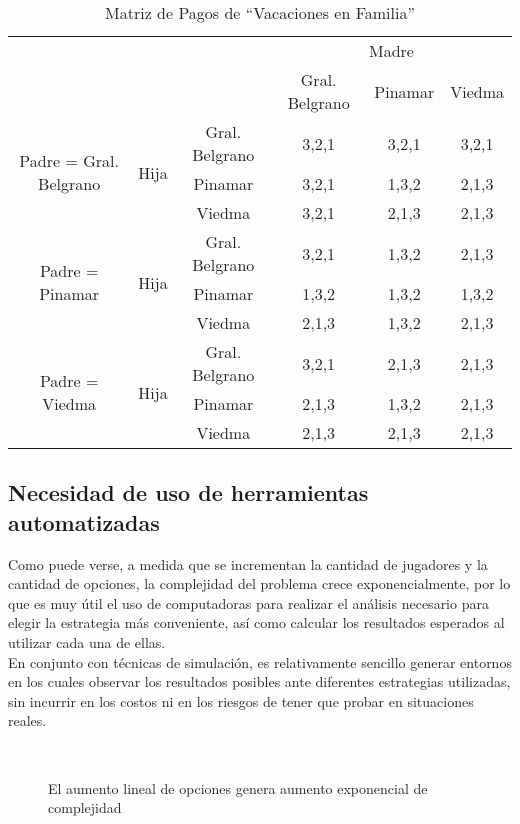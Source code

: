 \documentclass[10pt]{article}
\numberwithin{equation}{section}
\numberwithin{figure}{section}
\numberwithin{table}{section}
\begin{document}
\begin{table}[!ht]
\begin{center}
  \begin{tabular}{|c|c|c|c|c|c|}
  \hline
  
 \multicolumn{3}{|c|}{\multirow{2}{*}{}} & \multicolumn{3}{|c|}{Madre} \\ \cline{4-6}
 \multicolumn{3}{|c|}{} & Gral. Belgrano & Pinamar & Viedma \\ \hline
 \multirow{3}{*}{Padre = Gral. Belgrano}
 & \multirow{3}{*}{Hija}
   & Gral. Belgrano & 3,2,1 & 3,2,1 & 3,2,1\\ \cline{3-6}
   & & Pinamar & 3,2,1 & 1,3,2 & 2,1,3 \\ \cline{3-6}
   & & Viedma & 3,2,1 &2,1,3 & 2,1,3 \\ \hline
   \multirow{3}{*}{Padre = Pinamar}
 & \multirow{3}{*}{Hija}
   & Gral. Belgrano & 3,2,1 & 1,3,2 & 2,1,3\\ \cline{3-6}
   & & Pinamar & 1,3,2 & 1,3,2 & 1,3,2 \\ \cline{3-6}
   & & Viedma & 2,1,3 & 1,3,2 & 2,1,3 \\ \hline
   \multirow{3}{*}{Padre = Viedma}
 & \multirow{3}{*}{Hija}
   & Gral. Belgrano & 3,2,1 & 2,1,3 & 2,1,3\\ \cline{3-6}
   & & Pinamar & 2,1,3 & 1,3,2 & 2,1,3 \\ \cline{3-6}
   & & Viedma & 2,1,3 & 2,1,3 & 2,1,3 \\ \hline
  \end{tabular}
  \caption{Matriz de Pagos de ``Vacaciones en Familia''}
  \end{center}
\end{table}

\subsection{Necesidad de uso de herramientas automatizadas}
Como puede verse, a medida que se incrementan la cantidad de jugadores y la cantidad de opciones, la complejidad del problema crece exponencialmente, por lo que es muy útil el uso de computadoras para realizar el análisis necesario para elegir la estrategia más conveniente, así como calcular los resultados esperados al utilizar cada una de ellas.\\

En conjunto con técnicas de simulación, es relativamente sencillo generar entornos en los cuales observar los resultados posibles ante diferentes estrategias utilizadas, sin incurrir en los costos ni en los riesgos de tener que probar en situaciones reales. 
\begin{figure}[!ht]
\centering
\mbox{\quad
{}}
\caption{El aumento lineal de opciones genera aumento exponencial de complejidad} 
\end{figure}
\end{document}

